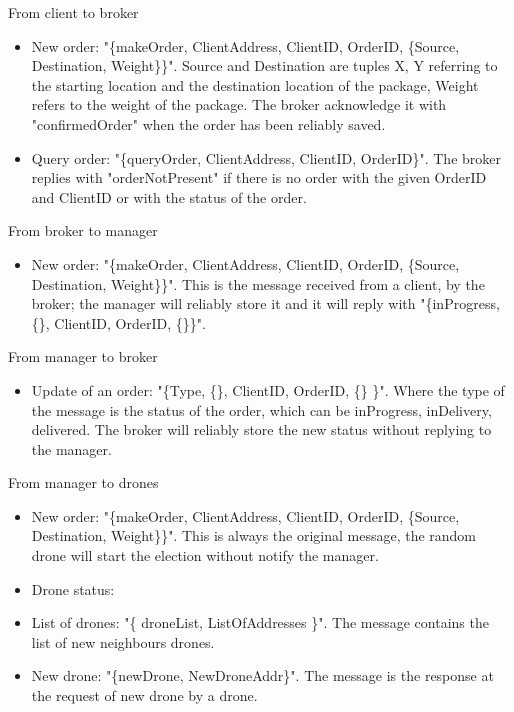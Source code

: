 \documentclass[a4paper, oneside]{memoir}
\begin{document}
From client to broker
\begin{itemize}
	\item New order: "\{makeOrder, ClientAddress, ClientID, OrderID, \{Source, Destination, Weight\}\}".
	Source and Destination are tuples {X, Y} referring to the starting location and the destination location of the package, Weight refers to the weight of the package. The broker acknowledge it with "confirmedOrder" when the order has been reliably saved.

	\item Query order: "\{queryOrder, ClientAddress, ClientID, OrderID\}". The broker replies with "orderNotPresent" if there is no order with the given OrderID and ClientID or with the status of the order.
\end{itemize} \vspace{1em}
From broker to manager
\begin{itemize}
	\item New order: "\{makeOrder, ClientAddress, ClientID, OrderID, \{Source, Destination, Weight\}\}".
	This is the message received from a client, by the broker; the manager will reliably store it and it will reply with "\{inProgress, \{\}, ClientID, OrderID, \{\}\}".
\end{itemize} \vspace{1em}
From manager to broker
\begin{itemize}
	\item Update of an order: "\{Type, \{\}, ClientID, OrderID, \{\} \}".
	Where the type of the message is the status of the order, which can be inProgress, inDelivery, delivered. The broker will reliably store the new status without replying to the manager.
\end{itemize}\vspace{1em}
From manager to drones
\begin{itemize}
	\item New order: "\{makeOrder, ClientAddress, ClientID, OrderID, \{Source, Destination, Weight\}\}".
	This is always the original message, the random drone will start the election without notify the manager.

	\item Drone status:


	\item List of drones: "\{ droneList, ListOfAddresses \}".
	The message contains the list of new neighbours drones.

	\item New drone: "\{newDrone, NewDroneAddr\}".
	The message is the response at the request of new drone by a drone.

\end{itemize} \vspace{1em}
\end{document}
